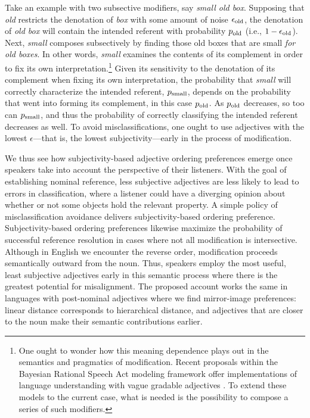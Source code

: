 \documentclass[preprint,authoryear]{elsarticle}\frenchspacing
\newcommand{\gcs}[1]{\textcolor{blue}{[gcs: #1]}}
\begin{document}
Take an example with two subsective modifiers, say \emph{small old box}. Supposing that \emph{old} restricts the denotation of \emph{box} with some amount of noise $\epsilon_{\footnotesize\textrm{old}}$, the denotation of \emph{old box} will contain the intended referent with probability $p_{\footnotesize\textrm{old}}$ (i.e., $1-\epsilon_{\footnotesize\textrm{old}}$). Next, \emph{small} composes subsectively by finding those old boxes that are small \emph{for old boxes}. In other words, \emph{small} examines the contents of its complement in order to fix its own interpretation.\footnote{One ought to wonder how this meaning dependence plays out in the semantics and pragmatics of modification. Recent proposals within the Bayesian Rational Speech Act modeling framework offer implementations of language understanding with vague gradable adjectives \citep{lassitergoodman2013,lassitergoodman2015}. To extend these models to the current case, what is needed is the possibility to compose a series of such modifiers.} Given its sensitivity to the denotation of its complement when fixing its own interpretation, the probability that \emph{small} will correctly characterize the intended referent, $p_{\footnotesize\textrm{small}}$, depends on the probability that went into forming its complement, in this case $p_{\footnotesize\textrm{old}}$. As $p_{\footnotesize\textrm{old}}$ decreases, so too can $p_{\footnotesize\textrm{small}}$, and thus the probability of correctly classifying the intended referent {decreases} as well. To avoid misclassifications, one ought to use adjectives with the lowest $\epsilon$---that is, the lowest subjectivity---early in the process of modification.

We thus see how subjectivity-based adjective ordering preferences emerge once speakers take into account the perspective of their listeners. With the goal of establishing nominal reference, less subjective adjectives are less likely to lead to errors in classification, where a listener could have a diverging opinion about whether or not some objects hold the relevant property. A simple policy of misclassification avoidance delivers subjectivity-based ordering preference. Subjectivity-based ordering preferences likewise maximize the probability of successful reference resolution in cases where not all modification is intersective. 
Although in English we encounter the reverse order, modification proceeds semantically outward from the noun. Thus, speakers employ the most useful, least subjective adjectives early in this semantic process where there is the greatest potential for misalignment. %
The proposed account works the same in languages with post-nominal adjectives where we find mirror-image preferences: linear distance corresponds to hierarchical distance, and adjectives that are closer to the noun make their semantic contributions earlier.
\end{document}
